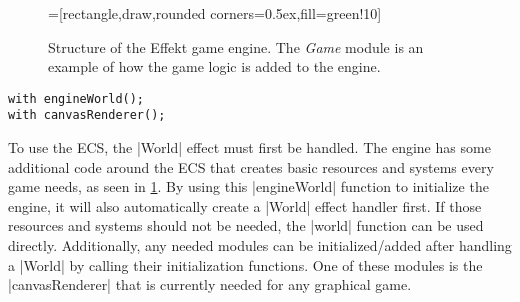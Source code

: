 \newcommand\Gamemodule[1]{
  \node[box,minimum height=4cm,minimum width=4cm] at (0,#1) {};
  \node[] at (0,#1+1.75) {Game (example)};
  \node[box,fill=yellow!20,minimum height=0.5cm,minimum width=3cm] (gamecomp) at (0,#1+1) {Velocity};
  \node[box,fill=yellow!20,minimum height=0.5cm,minimum width=3cm] at (0,#1+0.5) {Health};
  \node[box,fill=purple!20,minimum height=0.5cm,minimum width=3cm] (gameres) at (0,#1-0.25) {PauseState};
  \node[box,fill=blue!10,minimum height=0.5cm,minimum width=3cm] (gamesys) at (0,#1-1) {Move System};
  \node[box,fill=blue!10,minimum height=0.5cm,minimum width=3cm] at (0,#1-1.5) {Healing System};
  \draw[->] ([yshift=-0.25cm] gamecomp.west) -- node[near start,anchor=north] {register} ([yshift=-0.2cm] comp.east);
  \draw[->] (gameres.west) -- node[near start,anchor=north] {register} ([yshift=-0.2cm] res.east);
  \draw[->] ([yshift=-0.25cm] gamesys.west) -- node[near start,anchor=north] {register} ([yshift=-0.2cm] sys.east);
}

\begin{figure}
\centering
{}=[rectangle,draw,rounded corners=0.5ex,fill=green!10]
\caption{Structure of the Effekt game engine. The \textit{Game} module is an example of how the game logic is added to the engine.}
\label{fig:effektengine}
\end{figure}

\begin{lstlisting}[caption=Engine initialization]
with engineWorld();
with canvasRenderer();
\end{lstlisting}

To use the ECS, the |World| effect must first be handled. The engine has some additional code around the ECS that creates basic resources and systems every game needs, as seen in \cref{fig:effektengine}. By using this |engineWorld| function to initialize the engine, it will also automatically create a |World| effect handler first. If those resources and systems should not be needed, the |world| function can be used directly. Additionally, any needed modules can be initialized/added after handling a |World| by calling their initialization functions. One of these modules is the |canvasRenderer| that is currently needed for any graphical game.

